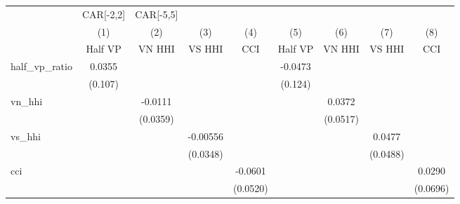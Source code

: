 {
\def\sym#1{\ifmmode^{#1}\else\(^{#1}\)\fi}
\begin{tabular}{l*{8}{c}}
\hline\hline
                    &CAR[-2,2]                                                                              &CAR[-5,5]                                                                              \\
                    &\multicolumn{1}{c}{(1)}&\multicolumn{1}{c}{(2)}&\multicolumn{1}{c}{(3)}&\multicolumn{1}{c}{(4)}&\multicolumn{1}{c}{(5)}&\multicolumn{1}{c}{(6)}&\multicolumn{1}{c}{(7)}&\multicolumn{1}{c}{(8)}\\
                    &\multicolumn{1}{c}{Half VP}&\multicolumn{1}{c}{VN HHI}&\multicolumn{1}{c}{VS HHI}&\multicolumn{1}{c}{CCI}&\multicolumn{1}{c}{Half VP}&\multicolumn{1}{c}{VN HHI}&\multicolumn{1}{c}{VS HHI}&\multicolumn{1}{c}{CCI}\\
\hline
half\_vp\_ratio       &      0.0355         &                     &                     &                     &     -0.0473         &                     &                     &                     \\
                    &     (0.107)         &                     &                     &                     &     (0.124)         &                     &                     &                     \\
[1em]
vn\_hhi              &                     &     -0.0111         &                     &                     &                     &      0.0372         &                     &                     \\
                    &                     &    (0.0359)         &                     &                     &                     &    (0.0517)         &                     &                     \\
[1em]
vs\_hhi              &                     &                     &    -0.00556         &                     &                     &                     &      0.0477         &                     \\
                    &                     &                     &    (0.0348)         &                     &                     &                     &    (0.0488)         &                     \\
[1em]
cci                 &                     &                     &                     &     -0.0601         &                     &                     &                     &      0.0290         \\
                    &                     &                     &                     &    (0.0520)         &                     &                     &                     &    (0.0696)         \\

\end{tabular}}
